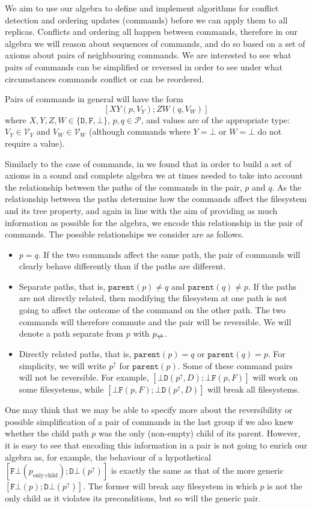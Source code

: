 \documentclass[12pt]{article}
\newcommand{\setvx}[1]{\mathcal{V}_{#1}}
\newcommand{\setp}{\mathcal{P}}
\newcommand{\empt}{\bot}
\newcommand{\parent}{\mathtt{parent}}
\newcommand{\pp}{p^\uparrow} %
\newcommand{\np}{p_{\centernot\leftrightarrow}} %
\newcommand{\fscommand}[2]{{#1#2}}
\newcommand{\fsregcommandchar}[1]{\mathtt{#1}}
\newcommand{\fsregcommand}[2]{\fscommand{\fsregcommandchar{#1}}{\fsregcommandchar{#2}}}
\newcommand{\cbf}{\fsregcommand{\empt}{F}}
\newcommand{\cbd}{\fsregcommand{\empt}{D}}
\newcommand{\cfb}{\fsregcommand{F}{\empt}}
\newcommand{\cdb}{\fsregcommand{D}{\empt}}
\newcommand{\cxy}{\fscommand{X}{Y}}
\newcommand{\czw}{\fscommand{Z}{W}}
\begin{document}
We aim to use our algebra to define and implement algorithms for conflict detection
and ordering updates (commands) before we can apply them to all replicas.
Conflicts and ordering all happen between commands, therefore in our algebra
we will reason about sequences of commands, 
and do so based on a set of axioms about pairs of neighbouring commands.
We are interested to see what pairs of commands can be simplified or reversed
in order to see under what circumstances commands conflict or can be reordered.

Pairs of commands in general will have the form
\[ [\cxy(p,V_Y); \czw(q,V_W)] \]
where $X,Y,Z,W\in\{\fsregcommandchar{D},\fsregcommandchar{F},\empt\}$, $p,q\in\setp$, and values are of the appropriate type: 
$V_Y\in\setvx{Y}$ and $V_W\in\setvx{W}$
(although commands where $Y=\empt$ or $W=\empt$ do not require a value).

Similarly to the case of commands, in \cite{NREC:alg} we found that in order to build
a set of axioms in a sound and complete algebra we at times needed to take into account
the relationship between the paths of the commands in the pair, $p$ and $q$.
As the relationship between the paths determine how the commands affect the filesystem
and its tree property, 
and again in line with the aim of providing as much information as possible for the algebra,
we encode this relationship in the pair of commands. The possible relationships we
consider are as follows.

\begin{itemize}
\item $p=q$. If the two commands affect the same path, the pair of commands
will clearly behave differently than if the paths are different.
%
\item Separate paths, that is, $\parent(p)\neq q$ and $\parent(q)\neq p$. If the paths
are not directly related, then modifying the filesystem at one path is not going
to affect the outcome of the command on the other path.
The two commands will therefore commute and the pair will be reversible.
We will denote a path separate from $p$ with $\np$.
%
\item Directly related paths, that is, $\parent(p)=q$ or $\parent(q)=p$.
For simplicity, we will write $\pp$ for $\parent(p)$.
Some of these command pairs will not be reversible.
For example, $[\cbd(\pp,D);\cbf(p,F)]$ will work on some filesystems,
while $[\cbf(p,F);\cbd(\pp,D)]$ will break all filesystems.
\end{itemize}

One may think that we may be able to specify more about the reversibility
or possible simplification of a pair of commands in the last group if we also
knew whether the child path $p$ was the only (non-empty) child of its parent.
However, it is easy to see that encoding this information in a pair
is not going to enrich our algebra as, for example,
the behaviour of a hypothetical $[\cfb(p_{\mathrm{only\ child}}); \cdb(\pp)]$
is exactly the same as that of the more generic
$[\cfb(p); \cdb(\pp)]$. The former will break any filesystem in which
$p$ is not the only child as it violates its preconditions, but so will
the generic pair.
\end{document}
